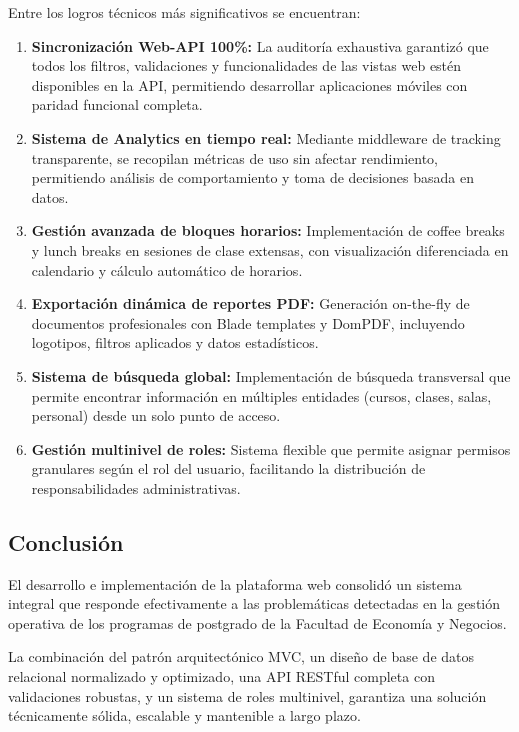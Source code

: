 Entre los logros técnicos más significativos se encuentran:

\begin{enumerate}
    \item \textbf{Sincronización Web-API 100\%:} La auditoría exhaustiva garantizó que todos los filtros, validaciones y funcionalidades de las vistas web estén disponibles en la API, permitiendo desarrollar aplicaciones móviles con paridad funcional completa.
    
    \item \textbf{Sistema de Analytics en tiempo real:} Mediante middleware de tracking transparente, se recopilan métricas de uso sin afectar rendimiento, permitiendo análisis de comportamiento y toma de decisiones basada en datos.
    
    \item \textbf{Gestión avanzada de bloques horarios:} Implementación de coffee breaks y lunch breaks en sesiones de clase extensas, con visualización diferenciada en calendario y cálculo automático de horarios.
    
    \item \textbf{Exportación dinámica de reportes PDF:} Generación on-the-fly de documentos profesionales con Blade templates y DomPDF, incluyendo logotipos, filtros aplicados y datos estadísticos.
    
    \item \textbf{Sistema de búsqueda global:} Implementación de búsqueda transversal que permite encontrar información en múltiples entidades (cursos, clases, salas, personal) desde un solo punto de acceso.
    
    \item \textbf{Gestión multinivel de roles:} Sistema flexible que permite asignar permisos granulares según el rol del usuario, facilitando la distribución de responsabilidades administrativas.
\end{enumerate}

\subsection{Conclusión}

El desarrollo e implementación de la plataforma web consolidó un sistema integral que responde efectivamente a las problemáticas detectadas en la gestión operativa de los programas de postgrado de la Facultad de Economía y Negocios. 

La combinación del patrón arquitectónico MVC, un diseño de base de datos relacional normalizado y optimizado, una API RESTful completa con validaciones robustas, y un sistema de roles multinivel, garantiza una solución técnicamente sólida, escalable y mantenible a largo plazo.

